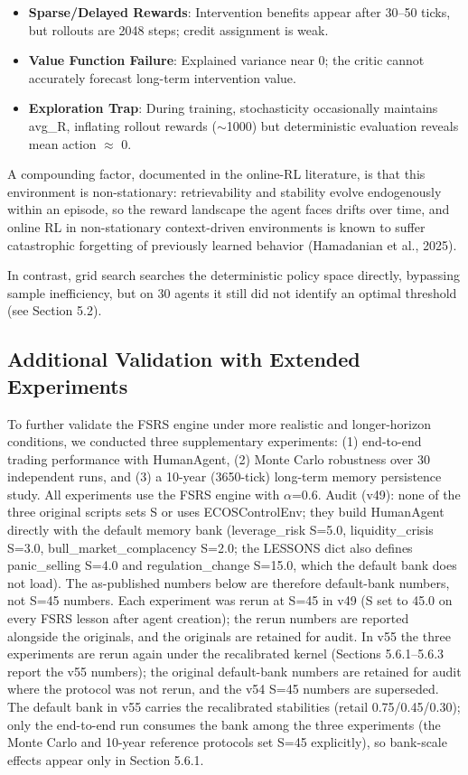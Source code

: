 \documentclass[11pt]{article}
\begin{document}
\begin{itemize}
\item \textbf{Sparse/Delayed Rewards}: Intervention benefits appear after 30--50 ticks, but rollouts are 2048 steps; credit assignment is weak.
\item \textbf{Value Function Failure}: Explained variance near 0; the critic cannot accurately forecast long-term intervention value.
\item \textbf{Exploration Trap}: During training, stochasticity occasionally maintains avg\_R, inflating rollout rewards ($\sim$1000) but deterministic evaluation reveals mean action $\approx$ 0.
\end{itemize}

A compounding factor, documented in the online-RL literature, is that this environment is non-stationary: retrievability and stability evolve endogenously within an episode, so the reward landscape the agent faces drifts over time, and online RL in non-stationary context-driven environments is known to suffer catastrophic forgetting of previously learned behavior (Hamadanian et al., 2025).

In contrast, grid search searches the deterministic policy space directly, bypassing sample inefficiency, but on 30 agents it still did not identify an optimal threshold (see Section 5.2).

\subsection{Additional Validation with Extended Experiments}
To further validate the FSRS engine under more realistic and longer-horizon conditions, we conducted three supplementary experiments: (1) end-to-end trading performance with HumanAgent, (2) Monte Carlo robustness over 30 independent runs, and (3) a 10-year (3650-tick) long-term memory persistence study. All experiments use the FSRS engine with $\alpha$=0.6. Audit (v49): none of the three original scripts sets S or uses ECOSControlEnv; they build HumanAgent directly with the default memory bank (leverage\_risk S=5.0, liquidity\_crisis S=3.0, bull\_market\_complacency S=2.0; the LESSONS dict also defines panic\_selling S=4.0 and regulation\_change S=15.0, which the default bank does not load). The as-published numbers below are therefore default-bank numbers, not S=45 numbers. Each experiment was rerun at S=45 in v49 (S set to 45.0 on every FSRS lesson after agent creation); the rerun numbers are reported alongside the originals, and the originals are retained for audit. In v55 the three experiments are rerun again under the recalibrated kernel (Sections 5.6.1--5.6.3 report the v55 numbers); the original default-bank numbers are retained for audit where the protocol was not rerun, and the v54 S=45 numbers are superseded. The default bank in v55 carries the recalibrated stabilities (retail 0.75/0.45/0.30); only the end-to-end run consumes the bank among the three experiments (the Monte Carlo and 10-year reference protocols set S=45 explicitly), so bank-scale effects appear only in Section 5.6.1.
\end{document}
